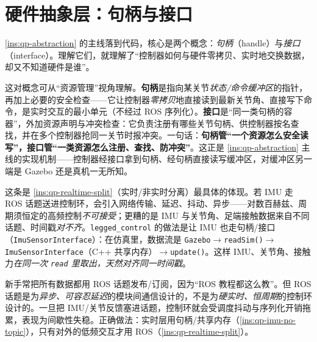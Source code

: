\section{硬件抽象层：句柄与接口}
\label{sec:qp-hwabs}

\cref{ins:qp-abstraction} 的主线落到代码，核心是两个概念：\emph{句柄}（handle）与\emph{接口}（interface）。理解它们，就理解了“控制器如何与硬件零拷贝、实时地交换数据，却又不知道硬件是谁”。

\begin{insight}[句柄 = 指针 + 安全检查；接口 = 句柄容器 + 资源管理]\label{ins:qp-handle-iface}
这对概念可从“资源管理”视角理解。\textbf{句柄}是指向某关节\emph{状态/命令缓冲区}的指针，再加上必要的安全检查——它让控制器\emph{零拷贝}地直接读到最新关节角、直接写下命令，是实时交互的最小单元（不经过 ROS 序列化）。\textbf{接口}是“同一类句柄的容器”，外加资源声明与冲突检查：它负责注册有哪些关节句柄、供控制器按名查找，并在多个控制器抢同一关节时报冲突。一句话：\textbf{句柄管“一个资源怎么安全读写”，接口管“一类资源怎么注册、查找、防冲突”}。这正是 \cref{ins:qp-abstraction} 主线的实现机制——控制器经接口拿到句柄、经句柄直接读写缓冲区，对缓冲区另一端是 Gazebo 还是真机一无所知。
\end{insight}

\begin{insight}\label{ins:qp-imu-no-topic}
这条是 \cref{ins:qp-realtime-split}（实时/非实时分离）最具体的体现。若 IMU 走 ROS 话题送进控制环，会引入网络传输、延迟、抖动、异步——对数百赫兹、周期须恒定的高频控制\emph{不可接受}；更糟的是 IMU 与关节角、足端接触数据来自不同话题、时间戳\emph{对不齐}。\texttt{legged\_control} 的做法是让 IMU 也走句柄/接口（\texttt{ImuSensorInterface}）：在仿真里，数据流是 \texttt{Gazebo}$\to$\texttt{readSim()}$\to$\texttt{ImuSensorInterface}（C++ 共享内存）$\to$\texttt{update()}。这样 IMU、关节角、接触力\emph{在同一次 \texttt{read} 里取出，天然对齐同一时间戳}\cite{sleiman2021unified}。
\end{insight}

\begin{pitfall}
新手常把所有数据都用 ROS 话题发布/订阅，因为“ROS 教程都这么教”。但 ROS 话题是为\emph{异步、可容忍延迟}的模块间通信设计的，不是为\emph{硬实时、恒周期}的控制环设计的。一旦把 IMU/关节反馈塞进话题，控制环就会受调度抖动与序列化开销拖累，表现为间歇性失稳。正确做法：实时层用句柄/共享内存（\cref{ins:qp-imu-no-topic}），只有对外的低频交互才用 ROS（\cref{ins:qp-realtime-split}）。
\end{pitfall}

